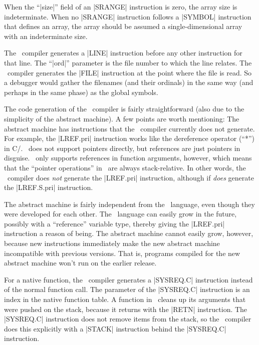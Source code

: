 When the ``|size|'' field of an |SRANGE| instruction is zero, the array size
is indeterminate. When no |SRANGE| instruction follows a |SYMBOL| instruction
that defines an array, the array should be assumed a single-dimensional array
with an indeterminate size.

The \Small\ compiler generates a |LINE| instruction before any other instruction
for that line. The ``|ord|'' parameter is the file number to which the line
relates. The \Small\ compiler generates the |FILE| instruction at the point
where the file is read. So a debugger would gather the filenames (and their
ordinals) in the same way (and perhaps in the same phase) as the global
symbols.


The code generation of the \Small\ compiler is fairly straightforward (also
due to the simplicity of the abstract machine). A few points are worth
mentioning:
\beginlist{1em}
\list{\lbullet}
  The abstract machine has instructions that the \Small\ compiler currently
  does not generate. For example, the |LREF.pri| instruction works like the
  dereference operator (``*'') in C/\Cpp. \Small\ does not support pointers
  directly, but references are just pointers in disguise. \Small\ only supports
  references in function arguments, however, which means that the ``pointer
  operations'' in \Small\ are always stack-relative. In other words, the
  \Small\ compiler does {\it not\/} generate the |LREF.pri| instruction, although
  if {\it does\/} generate the |LREF.S.pri| instruction.

  The abstract machine is fairly independent from the \Small\ language, even
  though they were developed for each other. The \Small\ language can easily
  grow in the future, possibly with a ``reference'' variable type, thereby
  giving the |LREF.pri| instruction a reason of being. The abstract machine
  cannot easily grow, however, because new instructions immediately make the
  new abstract machine incompatible with previous versions. That is, programs
  compiled for the new abstract machine won't run on the earlier release.

\list{\lbullet}
  For a native function, the \Small\ compiler generates a |SYSREQ.C| instruction
  instead of the normal function call. The parameter of the |SYSREQ.C| instruction
  is an index in the native function table. A function in \Small\ cleans up its
  arguments that were pushed on the stack, because it returns
  with the |RETN| instruction. The |SYSREQ.C| instruction does not remove
  items from the stack, so the \Small\ compiler does this explicitly with a
  |STACK| instruction behind the |SYSREQ.C| instruction.

